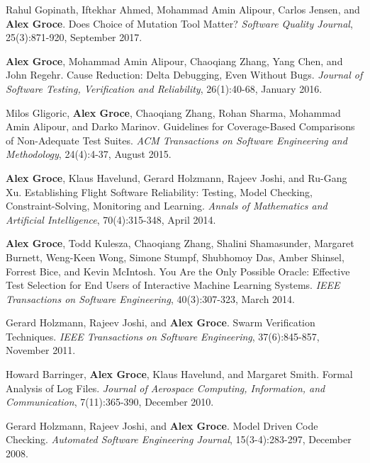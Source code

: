 \documentclass[ComputerScience]{vita}
\begin{document}
\begin{vita}
\begin{Refereed Journal Publications}
\item
Rahul Gopinath, Iftekhar Ahmed, Mohammad Amin Alipour, Carlos Jensen, and {\bf Alex Groce}.
\newblock Does Choice of Mutation Tool Matter?
\newblock \emph{Software Quality Journal}, 25(3):871-920, September 2017.

\item
{\bf Alex Groce}, Mohammad Amin Alipour, Chaoqiang Zhang, Yang Chen, and John Regehr.
\newblock Cause Reduction: Delta Debugging, Even Without Bugs.
\newblock \emph{Journal of Software Testing, Verification and Reliability}, 26(1):40-68, January 2016.

\item
Milos Gligoric, {\bf Alex Groce}, Chaoqiang Zhang, Rohan Sharma, Mohammad Amin Alipour, and Darko Marinov.
\newblock Guidelines for Coverage-Based Comparisons of Non-Adequate Test Suites.
\newblock \emph{ACM Transactions on Software Engineering and Methodology}, 24(4):4-37, August 2015.

\item
{\bf Alex Groce}, Klaus Havelund, Gerard Holzmann, Rajeev Joshi, and Ru-Gang Xu.
\newblock Establishing Flight Software Reliability: Testing, Model Checking, Constraint-Solving, Monitoring and Learning.
\newblock \emph{Annals of Mathematics and Artificial Intelligence}, 70(4):315-348, April 2014.

\item
{\bf Alex Groce}, Todd Kulesza, Chaoqiang Zhang, Shalini Shamasunder, Margaret Burnett, Weng-Keen Wong, Simone Stumpf, Shubhomoy Das, Amber Shinsel, Forrest Bice, and Kevin McIntosh.
\newblock You Are the Only Possible Oracle: Effective Test Selection for End Users of Interactive Machine Learning Systems.
\newblock \emph{IEEE Transactions on Software Engineering}, 40(3):307-323, March 2014.

\item 
Gerard Holzmann, Rajeev Joshi, and {\bf Alex Groce}.
\newblock Swarm Verification Techniques.
\newblock \emph{IEEE Transactions on Software Engineering}, 37(6):845-857, November 2011.

\item
Howard Barringer, {\bf Alex Groce}, Klaus Havelund, and Margaret Smith.
\newblock Formal Analysis of Log Files.
\newblock \emph{Journal of Aerospace Computing, Information, and Communication}, 7(11):365-390, December 2010.

\item Gerard Holzmann, Rajeev Joshi, and {\bf Alex Groce}.
\newblock Model Driven Code Checking.
\newblock \emph{Automated Software Engineering Journal}, 15(3-4):283-297, December 2008.


\end{Refereed Journal Publications}
\end{vita}
\end{document}
